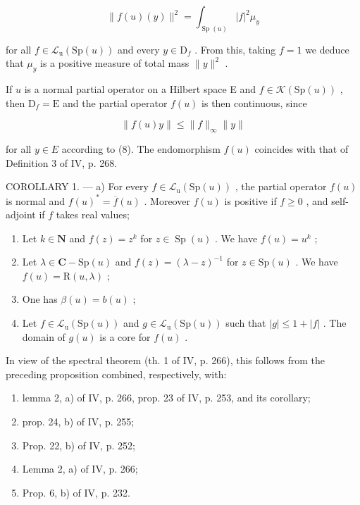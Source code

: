 \[
\| f (u) (y) \| ^ {2} = \int_ {\operatorname{Sp} (u)} | f | ^ {2} \mu_ {y}\tag{8}
\]

for all \(f \in \mathcal{L}_{\mathrm{u}}(\mathrm{Sp}(u))\) and every \(y \in \mathrm{D}_f\) . From this, taking \(f = 1\) we deduce that \(\mu_y\) is a positive measure of total mass \(\| y\|^2\) .

If \(u\) is a normal partial operator on a Hilbert space E and \(f \in \mathcal{K}(\mathrm{Sp}(u))\) , then \(\mathrm{D}_f = \mathrm{E}\) and the partial operator \(f(u)\) is then continuous, since

\[
\| f (u) y \| \leqslant \| f \| _ {\infty} \| y \|
\]

for all \(y \in E\) according to (8). The endomorphism \(f(u)\) coincides with that of Definition 3 of IV, p. 268.

COROLLARY 1. --- a) For every \(f \in \mathcal{L}_{\mathrm{u}}(\mathrm{Sp}(u))\) , the partial operator \(f(u)\) is normal and \(f(u)^{*} = \overline{f}(u)\) . Moreover \(f(u)\) is positive if \(f \geqslant 0\) , and self-adjoint if \(f\) takes real values;

\begin{enumerate}
\def\labelenumi{\alph{enumi})}
\setcounter{enumi}{1}
\item
  Let \(k \in \mathbf{N}\) and \(f(z) = z^{k}\) for \(z \in \operatorname{Sp}(u)\) . We have \(f(u) = u^{k}\) ;
\item
  Let \(\lambda \in \mathbf{C} - \mathrm{Sp}(u)\) and \(f(z) = (\lambda - z)^{-1}\) for \(z \in \mathrm{Sp}(u)\) . We have \(f(u) = \mathrm{R}(u, \lambda)\) ;
\item
  One has \(\beta(u) = b(u)\) ;
\item
  Let \(f \in \mathcal{L}_{\mathrm{u}}(\mathrm{Sp}(u))\) and \(g \in \mathcal{L}_{\mathrm{u}}(\mathrm{Sp}(u))\) such that \(|g| \leqslant 1 + |f|\) . The domain of \(g(u)\) is a core for \(f(u)\) .
\end{enumerate}

In view of the spectral theorem (th. 1 of IV, p. 266), this follows from the preceding proposition combined, respectively, with:

\begin{enumerate}
\def\labelenumi{\alph{enumi})}
\item
  lemma 2, a) of IV, p. 266, prop. 23 of IV, p. 253, and its corollary;
\item
  prop. 24, b) of IV, p. 255;
\item
  Prop. 22, b) of IV, p. 252;
\item
  Lemma 2, a) of IV, p. 266;
\item
  Prop. 6, b) of IV, p. 232.
\end{enumerate}

